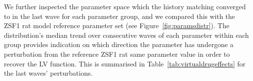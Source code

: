 \vspace{0.2cm}
We further inspected the parameter space which the history matching converged to in the last wave for each parameter group, and we compared this with the ZSF1 rat model reference parameter set (see Figure~\ref{fig:paramsdistr}). The distribution's median trend over consecutive waves of each parameter within each group provides indication on which direction the parameter has undergone a perturbation from the reference ZSF1 rat same parameter value in order to recover the LV function. This is summarised in Table~\ref{tab:virtualdrugeffects} for the last waves' perturbations.

\begin{figure}[!ht]
    \myfloatalign
    \quad
    \quad
    \quad

\end{figure}
